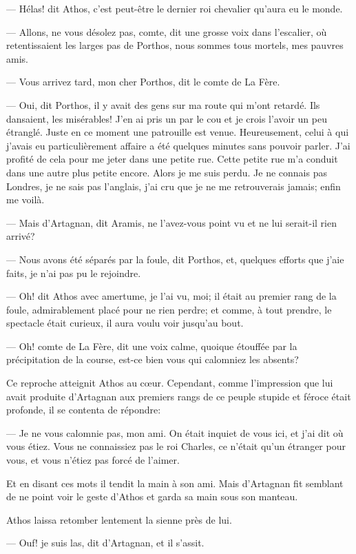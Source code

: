 — Hélas! dit Athos, c'est peut-être le dernier roi chevalier qu'aura eu le monde.

— Allons, ne vous désolez pas, comte, dit une grosse voix dans l'escalier, où retentissaient les larges pas de Porthos, nous sommes tous mortels, mes pauvres amis.

— Vous arrivez tard, mon cher Porthos, dit le comte de La Fère.

— Oui, dit Porthos, il y avait des gens sur ma route qui m'ont retardé. Ils dansaient, les misérables! J'en ai pris un par le cou et je crois l'avoir un peu étranglé. Juste en ce moment une patrouille est venue. Heureusement, celui à qui j'avais eu particulièrement affaire a été quelques minutes sans pouvoir parler. J'ai profité de cela pour me jeter dans une petite rue. Cette petite rue m'a conduit dans une autre plus petite encore. Alors je me suis perdu. Je ne connais pas Londres, je ne sais pas l'anglais, j'ai cru que je ne me retrouverais jamais; enfin me voilà.

— Mais d'Artagnan, dit Aramis, ne l'avez-vous point vu et ne lui serait-il rien arrivé?

— Nous avons été séparés par la foule, dit Porthos, et, quelques efforts que j'aie faits, je n'ai pas pu le rejoindre.

— Oh! dit Athos avec amertume, je l'ai vu, moi; il était au premier rang de la foule, admirablement placé pour ne rien perdre; et comme, à tout prendre, le spectacle était curieux, il aura voulu voir jusqu'au bout.

— Oh! comte de La Fère, dit une voix calme, quoique étouffée par la précipitation de la course, est-ce bien vous qui calomniez les absents?

Ce reproche atteignit Athos au cœur. Cependant, comme l'impression que lui avait produite d'Artagnan aux premiers rangs de ce peuple stupide et féroce était profonde, il se contenta de répondre:

— Je ne vous calomnie pas, mon ami. On était inquiet de vous ici, et j'ai dit où vous étiez. Vous ne connaissiez pas le roi Charles, ce n'était qu'un étranger pour vous, et vous n'étiez pas forcé de l'aimer.

Et en disant ces mots il tendit la main à son ami. Mais d'Artagnan fit semblant de ne point voir le geste d'Athos et garda sa main sous son manteau.

Athos laissa retomber lentement la sienne près de lui.

— Ouf! je suis las, dit d'Artagnan, et il s'assit.

